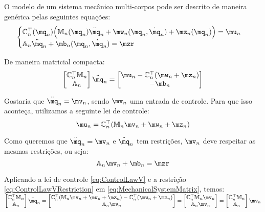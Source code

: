 O modelo de um sistema mec\^anico multi-corpos pode ser descrito de maneira gen\'erica pelas seguintes equa\c{c}\~oes:
\begin{equation} \label{eq:MechanicalSystem}
\begin{cases}
\mC_n^\top (\mq_n) \Big( \mM_n (\mq_n) \ddot{\mq}_n + \mw_n (\mq_n, \dot{\mq}_n) + \mz_n (\mq_n) \Big) = \mu_n \\
\mA_n \ddot{\mq}_n + \mb_n (\mq_n, \dot{\mq}_n) = \mzr
\end{cases}
\end{equation}

De maneira matricial compacta:
\begin{equation} \label{eq:MechanicalSystemMatrix}
\begin{bmatrix}
\mC_n^\top \mM_n \\
\mA_n
\end{bmatrix}
\ddot{\mq}_n
=
\begin{bmatrix}
\mu_n - \mC_n^\top(\mw_n + \mz_n) \\
-\mb_n
\end{bmatrix}
\end{equation}

Gostaria que $ \ddot{\mq}_n = \mv_n $, sendo $\mv_n$ uma entrada de controle. Para que isso aconte\c{c}a, utilizamos a seguinte lei de controle:
\begin{equation} \label{eq:ControlLawV}
\mu_n = \mC_n^\top ( \mM_n \mv_n + \mw_n + \mz_n )
\end{equation}

Como queremos que $ \ddot{\mq}_n = \mv_n $ e $\ddot{\mq}_n$ tem restri\c{c}\~oes, $\mv_n$ deve respeitar as mesmas restri\c{c}\~oes, ou seja:
\begin{equation} \label{eq:ControlLawVRestriction}
\mA_n \mv_n + \mb_n = \mzr
\end{equation}

Aplicando a lei de controle \eqref{eq:ControlLawV} e a restri\c{c}\~ao \eqref{eq:ControlLawVRestriction} em \eqref{eq:MechanicalSystemMatrix}, temos: \\

$ \begin{bmatrix}
\mC_n^\top \mM_n \\
\mA_n
\end{bmatrix}
\ddot{\mq}_n
=
\begin{bmatrix}
\mC_n^\top ( \mM_n \mv_n + \mw_n + \mz_n ) - \mC_n^\top(\mw_n + \mz_n) \\
\mA_n \mv_n
\end{bmatrix}
=
\begin{bmatrix}
\mC_n^\top  \mM_n \mv_n \\
\mA_n \mv_n
\end{bmatrix}
=
\begin{bmatrix}
\mC_n^\top \mM_n \\
\mA_n
\end{bmatrix}
\mv_n $

